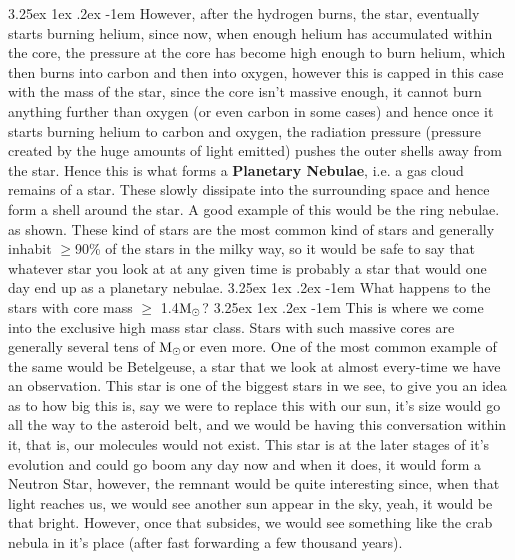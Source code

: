 \documentclass[a4paper,twoside,11pt]{article}
\makeatletter
\numberwithin{equation}{section}
\newcommand{\solmas}{\(\textup{M}_\odot\)}
\renewcommand\paragraph{\@startsection{paragraph}{5}{\z@}%
  {3.25ex \@plus1ex \@minus.2ex}%
  {-1em}%
  {\normalfont\normalsize\bfseries}}
\makeatother
\begin{document}
\paragraph{}
However, after the hydrogen burns, the star, eventually starts burning helium, since now, when enough helium has accumulated within the core, the pressure at the core has become high enough to burn helium, which then burns into carbon and then into oxygen, however this is capped in this case with the mass of the star, since the core isn't massive enough, it cannot burn anything further than oxygen (or even carbon in some cases) and hence once it starts burning helium to carbon and oxygen, the radiation pressure (pressure created by the huge amounts of light emitted) pushes the outer shells away from the star. Hence this is what forms a \textbf{Planetary Nebulae}, i.e. a gas cloud remains of a star. These slowly dissipate into the surrounding space and hence form a shell around the star. A good example of this would be the ring nebulae. as shown. These kind of stars are the most common kind of stars and generally inhabit $\geq$90\% of the stars in the milky way, so it would be safe to say that whatever star you look at at any given time is probably a star that would one day end up as a planetary nebulae. 
\paragraph{What happens to the stars with core mass $\geq$ 1.4\solmas?}
\paragraph{}
This is where we come into the exclusive high mass star class. Stars with such massive cores are generally several tens of \solmas or even more. One of the most common example of the same would be Betelgeuse, a star that we look at almost every-time we have an observation. This star is one of the biggest stars in we see, to give you an idea as to how big this is, say we were to replace this with our sun, it's size would go all the way to the asteroid belt, and we would be having this conversation within it, that is, our molecules would not exist. This star is at the later stages of it's evolution and could go boom any day now and when it does, it would form a Neutron Star, however, the remnant would be quite interesting since, when that light reaches us, we would see another sun appear in the sky, yeah, it would be that bright. However, once that subsides, we would see something like the crab nebula in it's place (after fast forwarding a few thousand years). 
\end{document}
